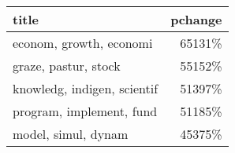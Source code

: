 \begin{tabular}{p{1.2cm}r}
\toprule
                       title &  pchange \\
\midrule
     econom, growth, economi &   65131\% \\
        graze, pastur, stock &   55152\% \\
 knowledg, indigen, scientif &   51397\% \\
    program, implement, fund &   51185\% \\
         model, simul, dynam &   45375\% \\
\bottomrule
\end{tabular}
